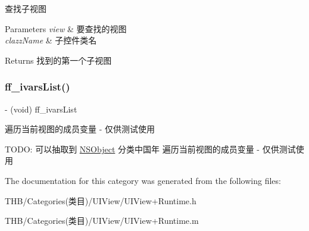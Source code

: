 查找子视图


\begin{DoxyParams}{Parameters}
{\em view} & 要查找的视图 \\
\hline
{\em clazz\+Name} & 子控件类名\\
\hline
\end{DoxyParams}
\begin{DoxyReturn}{Returns}
找到的第一个子视图 
\end{DoxyReturn}
\mbox{\label{category_u_i_view_07_runtime_08_a942ed2555858e4e283c432579df0f815}} 
\subsubsection{\texorpdfstring{ff\+\_\+ivars\+List()}{ff\_ivarsList()}}
{\footnotesize\ttfamily -\/ (void) ff\+\_\+ivars\+List \begin{DoxyParamCaption}{ }\end{DoxyParamCaption}}



遍历当前视图的成员变量 -\/ 仅供测试使用 

T\+O\+DO\+: 可以抽取到 \mbox{\hyperlink{class_n_s_object-p}{N\+S\+Object}} 分类中国年 遍历当前视图的成员变量 -\/ 仅供测试使用 

The documentation for this category was generated from the following files\+:\begin{DoxyCompactItemize}
\item 
T\+H\+B/\+Categories(类目)/\+U\+I\+View/U\+I\+View+\+Runtime.\+h\item 
T\+H\+B/\+Categories(类目)/\+U\+I\+View/U\+I\+View+\+Runtime.\+m\end{DoxyCompactItemize}
